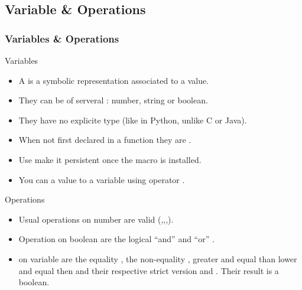 \subsection{Variable \& Operations}
\begin{frame}
  \frametitle<presentation>{Variables \& Operations}
  \begin{block}{Variables}
    \begin{itemize}
    \item A  is a symbolic representation associated to a value.
    \item They can be of serveral : number, string or boolean.
    \item They have no explicite type (like in Python, unlike C or Java).
    \item When not first declared in a function they are .
    \item Use  make it persistent once the macro is installed.
    \item You can  a value to a variable using operator \code{=}.
    \end{itemize}
  \end{block}
  \begin{block}{Operations}
    \begin{itemize}
    \item Usual operations on number are valid (\code{+},\code{-},\code{*},\code{/}).
    \item Operation on boolean are the logical ``and'' \code{\&\&} and ``or''  \code{||}.
    \item {} on variable are the equality \code{==},
      the non-equality \code{!=}, greater and equal than \code{>=}
      lower and equal then \code{<=} and their respective strict
      version \code{>} and \code{<}. Their result is a boolean.
    \end{itemize}
  \end{block}
\end{frame}


